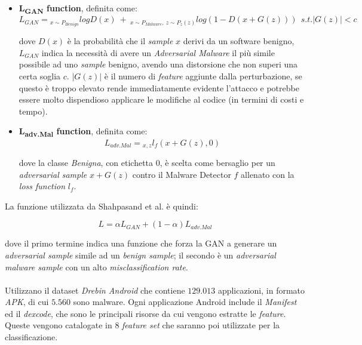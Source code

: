 \begin{itemize}
    \item \textbf{L\textsubscript{GAN} function}\cite{8672711}, definita come: 
            \[
                L_{GAN} = {}_{x \sim P_{Benign}} logD(x) \ + \
                          {}_{x \sim P_{Malware}, \ z \sim P_{z}(z)} log(1 - D(x + G(z))) \ \ 
                          s.t.|G(z)| < c
            \]
            
            dove \(D(x)\) è la probabilità che il \textit{sample} \(x\) derivi da un software benigno, \(L_{GAN}\) indica la necessità di avere un \textit{Adversarial Malware} il più simile possibile ad uno \textit{sample} benigno, avendo una distorsione che non superi una certa soglia \(c\). \(|G(z)|\) è il numero di \textit{feature} aggiunte dalla perturbazione, se questo è troppo elevato rende immediatamente evidente l'attacco e potrebbe essere molto dispendioso applicare le modifiche al codice (in termini di costi e tempo).
    
    \item \textbf{L\textsubscript{adv.Mal} function}\cite{8672711}, definita come: 
            \[
                L_{adv.Mal} = {}_{x, z} l_f(x + G(z), 0)
            \]
            
            dove la classe \textit{Benigna}, con etichetta 0, è scelta come bersaglio per un \textit{adversarial sample} \(x + G(z)\) contro il Malware Detector \(f\) allenato con la \textit{loss function} \(l_f\). %
\end{itemize}

La funzione utilizzata da Shahpasand et al. è quindi:

\[
    L = \alpha L_{GAN} + (1 - \alpha )L_{adv.Mal}
\]



dove il primo termine indica una funzione che forza la GAN a generare un \textit{adversarial sample} simile ad un \textit{benign sample}; il secondo è un \textit{adversarial malware sample} con un alto \textit{misclassification rate}.\\
\\
Utilizzano il dataset \textit{Drebin Android} che contiene \(129.013\) applicazioni, in formato \textit{APK}, di cui \(5.560\) sono malware. Ogni applicazione Android include il \textit{Manifest} ed il \textit{dexcode}, che sono le principali risorse da cui vengono estratte le \textit{feature}. Queste vengono catalogate in 8 \textit{feature set} che saranno poi utilizzate per la classificazione.\\


